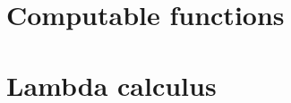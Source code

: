 \documentclass[oneside]{book}
\begin{document}
\part{Computable functions}










\part{Lambda calculus}


\end{document}

